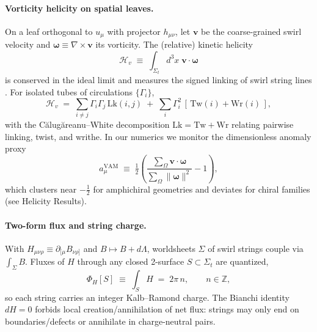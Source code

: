 \documentclass[11pt, preprint,titlepage]{revtex4-2}
\begin{document}
	\paragraph{Vorticity helicity on spatial leaves.}
	On a leaf orthogonal to \(u_\mu\) with projector \(h_{\mu\nu}\), let \(\mathbf{v}\) be the coarse-grained swirl velocity and \(\boldsymbol{\omega}\equiv\nabla\times\mathbf{v}\) its vorticity. The (relative) kinetic helicity
	\begin{equation}
		\mathcal{H}_{\!v} \;\equiv\; \int_{\Sigma_t} d^3x\; \mathbf{v}\cdot\boldsymbol{\omega}
	\end{equation}
	is conserved in the ideal limit and measures the signed linking of swirl string lines \cite{Moffatt1969,Arnold1998}.
	For isolated tubes of circulations \(\{\Gamma_i\}\),
	\begin{equation}
		\mathcal{H}_{\!v} \;=\; \sum_{i\neq j} \Gamma_i\Gamma_j\,\mathrm{Lk}(i,j)\;+\;\sum_i \Gamma_i^2\,[\,\mathrm{Tw}(i)+\mathrm{Wr}(i)\,],
		\label{eq:calug}
	\end{equation}
	with the Călugăreanu--White decomposition \(\mathrm{Lk}=\mathrm{Tw}+\mathrm{Wr}\) relating pairwise linking, twist, and writhe. In our numerics we monitor the dimensionless anomaly proxy
	\begin{equation}
		a_\mu^{\mathrm{VAM}} \;\equiv\; \tfrac12\!\left(\frac{\sum_{\Omega}\mathbf{v}\!\cdot\!\boldsymbol{\omega}}{\sum_{\Omega}\|\boldsymbol{\omega}\|^2}-1\right),
	\end{equation}
	which clusters near \(-\tfrac12\) for amphichiral geometries and deviates for chiral families (see Helicity Results).

	\paragraph{Two-form flux and string charge.}
	With \(H_{\mu\nu\rho}\equiv\partial_{[\mu}B_{\nu\rho]}\) and \(B\mapsto B+d\Lambda\),
	worldsheets \(\Sigma\) of swirl strings couple via \(\int_\Sigma B\).
	Fluxes of \(H\) through any closed 2-surface \(S\subset\Sigma_t\) are quantized,
	\begin{equation}
		\Phi_H[S] \;\equiv\; \int_S H \;=\; 2\pi\,n,\qquad n\in\mathbb{Z},
	\end{equation}
	so each string carries an integer Kalb--Ramond charge. The Bianchi identity \(dH=0\) forbids local creation/annihilation of net flux: strings may only end on boundaries/defects or annihilate in charge-neutral pairs.
\end{document}
